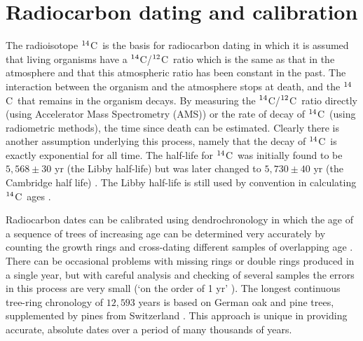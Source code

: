 \documentclass[12pt]{article}
\newcommand{\cft}{$^{\rm 14}$C}
\newcommand{\ctw}{$^{\rm 12}$C}
\begin{document}




\section{Radiocarbon dating and calibration} %
\label{section2}

The radioisotope \cft~is the basis for radiocarbon dating in which it
is assumed that living organisms have a 
\cft/\ctw~ratio which is the same as that in the atmosphere and that 
this atmospheric ratio has been constant in the past. The interaction between
the organism and the atmosphere stops at death, and the \cft~that remains
in the organism decays. By measuring the \cft/\ctw~ratio directly 
(using Accelerator Mass Spectrometry (AMS)) or the rate of decay of 
\cft~(using radiometric methods), the time since death can be estimated.
Clearly there is another assumption underlying this process, namely that 
the decay of \cft~is exactly exponential for all time. The half-life for 
\cft~was initially found to be $5,568\pm 30$ yr (the Libby half-life) 
but was later changed to $5,730\pm 40$ yr (the Cambridge half life)
\cite{aitken90}. The Libby half-life is still used by convention in 
calculating \cft~ages \cite{aitken90,stuiver77,donahue90}.

Radiocarbon dates can be calibrated using dendrochronology in which the age 
of a sequence of trees of increasing age can be determined very accurately 
by counting the growth rings and cross-dating different samples of
overlapping age \cite{aitken90}. There can be occasional problems with 
missing rings or double rings produced in a single year, but with 
careful analysis and checking of several samples the errors in this 
process are very small (`on the order of 1 yr' \cite{reimer04}). 
The longest continuous tree-ring chronology of $12,593$ years
is based on German oak and pine trees, 
supplemented by pines from Switzerland \cite{friedrich04,schaub08}. 
This approach is unique in providing accurate, 
absolute dates over a period of many thousands of years.
\end{document}
